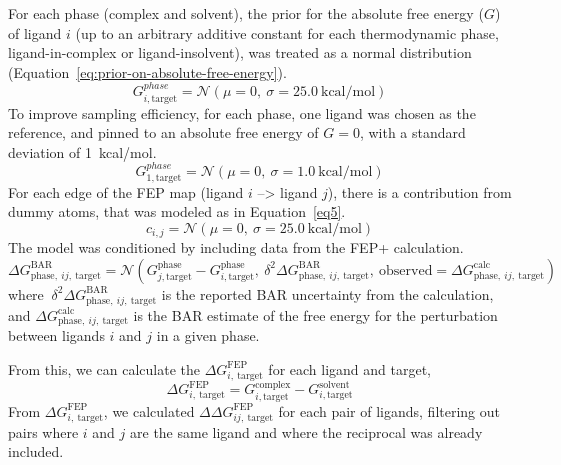 \documentclass[phd,tocprelim]{cornell}
\begin{document}
For each phase (complex and solvent), the prior for the absolute free energy ($G$) of ligand $i$ (up to an arbitrary additive constant for each thermodynamic phase, ligand-in-complex or ligand-insolvent), was treated as a normal distribution (Equation~\ref{eq:prior-on-absolute-free-energy}). 
\begin{equation}\label{eq:prior-on-absolute-free-energy}
G^{phase}_{i,\text{target}} = \mathcal{N}(\mu=0,~\sigma=25.0~\text{kcal/mol})
\end{equation}
To improve sampling efficiency, for each phase, one ligand was chosen as the reference, and pinned to an absolute free energy of $G = 0$, with a standard deviation of 1~kcal/mol.
\begin{equation}\label{eq:prior-on-absolute-free-energy}
G^{phase}_{1,\text{target}} = \mathcal{N}(\mu=0,~\sigma=1.0~\text{kcal/mol})
\end{equation}
For each edge of the FEP map (ligand $i$ --> ligand $j$), there is a contribution from dummy atoms, that was modeled as in Equation~\ref{eq5}.  
\begin{equation}\label{eq5}
c_{i,j} = \mathcal{N}(\mu=0,~\sigma=25.0~\text{kcal/mol})
\end{equation}
The model was conditioned by including data from the FEP+ calculation.  
\begin{equation}\label{eq6}
\Delta G^\text{BAR}_{\text{phase}, ~ij, ~\text{target}} = \mathcal{N}(G^\text{phase}_{j, \text{target}} - G^\text{phase}_{i, \text{target}},~\delta^2\Delta G^\text{BAR}_{\text{phase}, ~ij, ~\text{target}}, ~\text{observed} = \Delta G^\text{calc}_{\text{phase},~ij,~\text{target}})
\end{equation}
where $~\delta^2\Delta G^\text{BAR}_{\text{phase}, ~ij, ~\text{target}}$ is the reported BAR uncertainty from the calculation, and $\Delta G^\text{calc}_{\text{phase},~ij,~\text{target}}$ is the BAR estimate of the free energy for the perturbation between ligands $i$ and $j$ in a given phase. 

From this, we can calculate the $\Delta G^\text{FEP}_{i, ~\text{target}}$ for each ligand and target,
\begin{equation}\label{eq7}
\Delta G^\text{FEP}_{i, ~\text{target}} = G^\text{complex}_{i, \text{target}} - G^\text{solvent}_{i, \text{target}}
\end{equation}
From $\Delta G^\text{FEP}_{i,~\text{target}}$, we calculated $\Delta \Delta G^\text{FEP}_{ij, ~\text{target}}$ for each pair of ligands, filtering out pairs where $i$ and $j$ are the same ligand and where the reciprocal was already included. 
\end{document}
